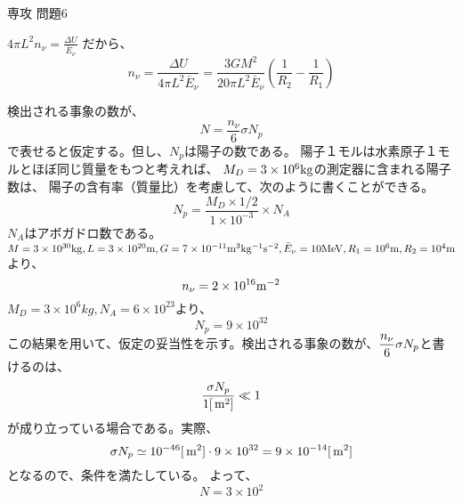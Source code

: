 \documentclass[fleqn]{jbook}
\begin{document}
\begin{answer}{専攻 問題6}{}
\begin{subanswers}
\SubAnswer
$\displaystyle{
4\pi L^{2}n_{\nu} = \frac{\Delta U}{\bar{E}_{\nu}}
}$
だから、
\[
n_{\nu} = \frac{\Delta U}{4\pi L^{2}\bar{E}_{\nu}}
        = \frac{3GM^{2}}{20\pi L^{2}\bar{E}_{\nu}}
                    \left(\frac{1}{R_{2}}-\frac{1}{R_{1}}\right)
\]

\SubAnswer
検出される事象の数が、
\[
N = \frac{n_{\nu}}{6}\sigma N_{p}
\]
で表せると仮定する。但し、$N_{p}$は陽子の数である。
陽子１モルは水素原子１モルとほぼ同じ質量をもつと考えれば、
$M_{D}=3 \times 10^{6} \rm kg$の測定器に含まれる陽子数は、
陽子の含有率（質量比）を考慮して、次のように書くことができる。
\[
N_{p} = \frac{M_{D} \times 1/2}{1 \times 10^{-3}} \times N_{A}
\]
$N_{A}$はアボガドロ数である。$M = 3 \times 10^{30} {\rm kg}, 
L = 3 \times 10^{20}{\rm m}
, G = 7 \times 10^{-11}{\rm m^{3}kg^{-1}s^{-2}},\\
\bar{E}_{\nu} = 10 {\rm MeV}, R_{1} = 10^{6}{\rm m}, R_{2} = 10^{4}
{\rm m}$より、
\[
n_{\nu} = 2 \times 10^{16} {\rm m^{-2}}
\]
$M_{D} = 3 \times 10^{6}kg, N_{A} = 6 \times 10^{23}$より、
\[
N_{p} = 9 \times 10^{32}
\]
この結果を用いて、仮定の妥当性を示す。検出される事象の数が、$\displaystyle{\frac{n_{\nu}}{6}\sigma N_{p}}$と書けるのは、
\[ \frac{\sigma N_{p}}{1[{\,{\rm m^2}}]} \ll 1 \]
が成り立っている場合である。実際、
\[ \sigma N_{p} \simeq 10^{-46}[{\,{\rm m^2}}]\cdot 9\times 10^{32}=9\times 10^{-14}[{\,{\rm m^2}}]
\]
となるので、条件を満たしている。
よって、
\[
N = 3 \times 10^{2}
\]


\end{subanswers}
\end{answer}
\end{document}
